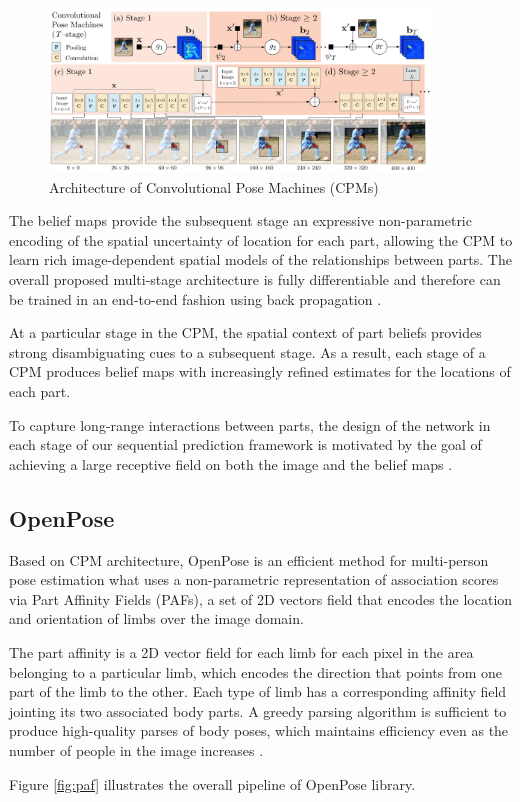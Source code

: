 \begin{figure}[htbp]
\centering\includegraphics[width=0.9\textwidth]{./img/eft.png}
  \caption[Architecture of Convolutional Pose Machines (CPMs)]{Architecture of Convolutional Pose Machines (CPMs) \cite{Wei2016}}\label{fig:eft}
\end{figure}

\par The belief maps provide the subsequent stage an expressive non-parametric encoding of the spatial uncertainty of location for each part, allowing the CPM to learn rich image-dependent spatial models of the relationships between parts. The overall proposed multi-stage architecture is fully differentiable and therefore can be trained in an end-to-end fashion using back propagation \cite{Wei2016}.
\par At a particular stage in the CPM, the spatial context of part beliefs provides strong disambiguating cues to a subsequent stage. As a result, each stage of a CPM produces belief maps with increasingly refined estimates for the locations of each part.
\par To capture long-range interactions between parts, the design of the network in each stage of our sequential prediction framework is motivated by the goal of achieving a large receptive field on both the image and the belief maps \cite{Wei2016}.

\subsection*{OpenPose}
\par Based on CPM architecture, OpenPose is an efficient method for multi-person pose estimation what uses a non-parametric representation of association scores via Part Affinity Fields (PAFs), a set of 2D vectors field that encodes the location and orientation of limbs over the image domain.
\par The part affinity is a 2D vector field for each limb for each pixel in the area belonging to a particular limb, which encodes the direction that points from one part of the limb to the other. Each type of limb has a corresponding affinity field jointing its two associated body parts. A greedy parsing algorithm is sufficient to produce high-quality parses of body poses, which maintains efficiency even as the number of people in the image increases \cite{cao2017realtime}.
\par Figure \ref{fig:paf} illustrates the overall pipeline of OpenPose library.

